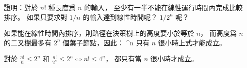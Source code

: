 \startEXERCISE
證明：對於 $n!$ 種長度爲 $n$ 的輸入，
至少有一半不能在線性運行時間內完成比較排序。
如果只要求對 $1/n$ 的輸入達到線性時間呢？
 $1/2^n$ 呢？
\stopEXERCISE

\startANSWER
如果能在線性時間內排序，則路徑在決策樹上的高度要小於等於 $n$，
而高度爲 $n$ 的二叉樹最多有 $2^n$ 個葉子節點，因此：
\startformula
{} ^n
\stopformula
只有 $n$ 很小時上式才能成立。

對於 $\frac{n!}{n} \le 2^n$ 和 $\frac{n!}{2^n}\le 2^n \Leftrightarrow n! \le 4^n$，
都只有當 $n$ 很小時才成立。
\stopANSWER
